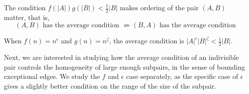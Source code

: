     \begin{remark}
        The condition $f(|A|) g(|B|) < \frac{1}{2} |B|$ makes ordering of the pair $(A,B)$ matter, that is,
        \[
            (A,B) \text{ has the average condition } \not\Rightarrow (B,A) \text{ has the average condition }
        \]
    \end{remark}

    \begin{remark}[Remark 4.7]
        When $f(n) = n^\epsilon$ and $g(n) = n^\zeta$, the average condition is $|A|^\epsilon |B|^\zeta < \frac{1}{2} |B|$.
    \end{remark}

    Next, we are interested in studying how the average condition of an indivisible pair controls the homogeneity
    of large enough subpairs, in the sense of bounding exceptional edges.
    We study the $f$ and $\epsilon$ case separately, as the specific case of $\epsilon$ gives a slightly better condition
    on the range of the size of the subpair.

